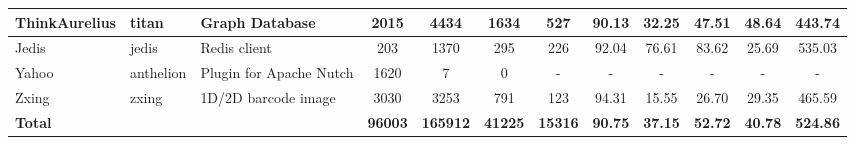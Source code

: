 \begin{table*}[]
{\begin{tabular}{lllccccccccc}
ThinkAurelius               & titan                                                         & Graph Database                                                           & 2015           & 4434            & 1634                                                             & 527            & 90.13          & 32.25          & 47.51          & 48.64                                                                                 & 443.74                                               \\ \hline
Jedis                       & jedis                                                         & Redis client                                                             & 203            & 1370            & 295                                                              & 226            & 92.04          & 76.61          & 83.62          & 25.69                                                                                 & 535.03                                               \\ \hline
Yahoo                       & anthelion                                                     & Plugin for Apache Nutch                                                  & 1620           & 7               & 0                                                                & -              & -              & -              & -              & -                                                                                     & -                                                    \\ \hline
Zxing                       & zxing                                                         & 1D/2D barcode image                                                      & 3030           & 3253            & 791                                                              & 123            & 94.31          & 15.55          & 26.70          & 29.35                                                                                 & 465.59                                               \\ \hline
\textbf{Total}              & \textbf{}                                                     & \textbf{}                                                                & \textbf{96003} & \textbf{165912} & \textbf{41225}                                                   & \textbf{15316} & \textbf{90.75} & \textbf{37.15} & \textbf{52.72} & \textbf{40.78}                                                                        & \textbf{524.86}                                      \\ \hline
\end{tabular}%
}
\end{table*}